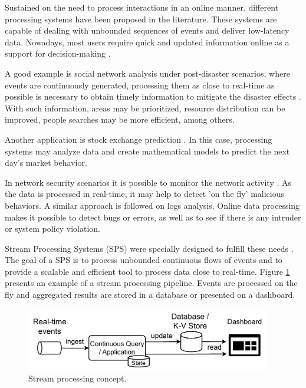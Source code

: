 Sustained on the need to process interactions in an online manner, different processing systems have been proposed in the literature. These systems are capable of dealing with unbounded sequences of events and deliver low-latency data. Nowadays, most users require quick and updated information online as a support for decision-making \citep{OzalRT11}.

A good example is social network analysis under post-disaster scenarios, where events are continuously generated, processing them as close to real-time as possible is necessary to obtain timely information to mitigate the disaster effects \citep{WladdimiroICTDM2016}. With such information, areas may be prioritized, resource distribution can be improved,  people searches may be more efficient, among others.

Another application is stock exchange prediction \cite{DingWPXL17}. In this case,  processing systems may analyze data and create mathematical models to predict the next day’s market behavior. 

In network security scenarios it is possible to monitor the network activity \citep{Zhao8230279}. As the data is processed in real-time, it may help to detect 'on the fly' malicious behaviors. A similar approach is followed on logs analysis. Online data processing makes it possible to detect bugs or errors, as well as to see if there is any intruder or system policy violation.

Stream Processing Systems (SPS) were specially designed to fulfill these needs \cite{Leibiusky0030281}. The goal of a SPS is to process unbounded continuous flows of events and to provide a scalable and efficient tool to process data close to real-time. Figure \ref{fig:stream-processing-concept} presents an example of a stream processing pipeline. Events are processed on the fly and aggregated results are stored in a database or presented on a dashboard.

\begin{figure}[!ht]
    \centering
    \includegraphics[width=0.95\textwidth]{figures/concepts/StreamProcessing-Concept.pdf}
    \caption{Stream processing concept.}
    \label{fig:stream-processing-concept}
\end{figure}

